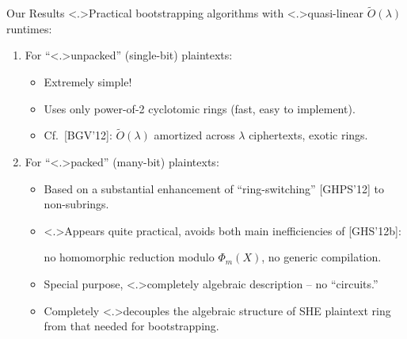 \documentclass[shadow,xcolor=pdftex,svgnames,table,t]{beamer}
\begin{document}
\begin{frame}[label=results]{Our Results}
  \onslide<+->
  \alert<.>{Practical} bootstrapping algorithms with
  \alert<.>{quasi-linear} $\tilde{O}(\lambda)$ runtimes:

  \begin{enumerate}
  \item<+-> For ``\alert<.>{unpacked}'' (single-bit) plaintexts:

    \begin{itemize}
    \item[\GreenCheck] Extremely simple!
      \smallskip
    \item[\GreenCheck] Uses only power-of-2 cyclotomic rings (fast,
      easy to implement).
      \smallskip
    \item<+-> Cf.~{\footnotesize [BGV'12]}: $\tilde{O}(\lambda)$
      \alert{amortized} across $\lambda$ ciphertexts, exotic rings.
    \end{itemize}

    \medskip
  \item<+-> For ``\alert<.>{packed}'' (many-bit) plaintexts:

    \begin{itemize}
    \item<+-> Based on a substantial enhancement of ``ring-switching''
      {\footnotesize [GHPS'12]} to non-subrings.

      \smallskip 
    \item<+->[\GreenCheck] \alert<.>{Appears quite practical}, avoids
      both main inefficiencies of {\footnotesize [GHS'12b]}:

      no homomorphic reduction modulo $\Phi_{m}(X)$, no generic
      compilation.

      \smallskip
    \item<+->[\GreenCheck] Special purpose, \alert<.>{completely
        algebraic description} -- no ``circuits.''

      \smallskip
    \item<+->[\GreenCheck] Completely \alert<.>{decouples the
        algebraic structure} of SHE plaintext ring from that needed
      for bootstrapping.
    \end{itemize}
  \end{enumerate}
\end{frame}
\end{document}
